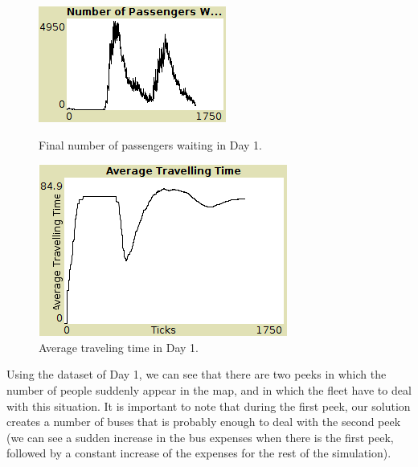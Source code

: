 \begin{figure}[htbp]
\centering
\begin{minipage}{.48\textwidth}
  \includegraphics[width=\linewidth]{src/nr_pass_waiting.png}
  \caption{Final number of passengers waiting in Day 1.}
  \label{fig:pass_waiting}
\end{minipage}
\begin{minipage}{.48\textwidth}
  \includegraphics[width=\linewidth]{src/avg_tt.png}
  \caption{Average traveling time in Day 1.}
  \label{fig:avg_tt}
\end{minipage}
\end{figure}

Using the dataset of Day 1, we can see that there are two peeks in which the number of people suddenly appear in the map, and in which the fleet have to deal with this situation. It is important to note that during the first peek, our solution creates a number of buses that is probably enough to deal with the second peek (we can see a sudden increase in the bus expenses when there is the first peek, followed by a constant increase of the expenses for the rest of the simulation).

